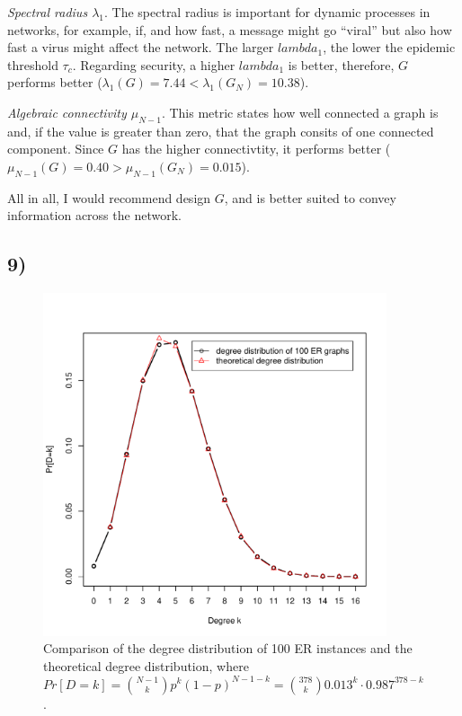 \documentclass{article}
\begin{document}
\vspace*{0.5em}
\noindent\emph{Spectral radius $\lambda_1$}. The spectral radius is important
for dynamic processes in networks, for example, if, and how fast, a
message might go ``viral'' but also how fast a virus might affect the
network. The larger $lambda_1$, the lower the epidemic threshold
$\tau_c$. Regarding security, a higher $lambda_1$ is better,
therefore, $G$ performs better ($\lambda_1(G) = 7.44 < \lambda_1(G_N)
= 10.38$).

\vspace*{0.5em}
\noindent\emph{Algebraic connectivity $\mu_{N-1}$}. This metric states how well connected a graph is
and, if the value is greater than zero, that the graph consits of one
connected component. Since $G$ has the higher connectivtity, it
performs better ($\mu_{N-1}(G) = 0.40 > \mu_{N-1}(G_N) = 0.015$).

\vspace*{0.5em}
\noindent All in all, I would recommend design $G$, and is better suited to
convey information across the network.

\subsection*{9)}

\begin{figure}[H]
  \centering
  \includegraphics[width=0.9\textwidth]{er_degree_distribution}
  \caption{Comparison of the degree distribution of 100 ER instances
    and the theoretical degree distribution, where $Pr[D=k] =
    \binom{N-1}{k}p^k(1-p)^{N-1-k}=\binom{378}{k}0.013^k\cdot0.987^{378-k}$.}
\end{figure}
\end{document}
